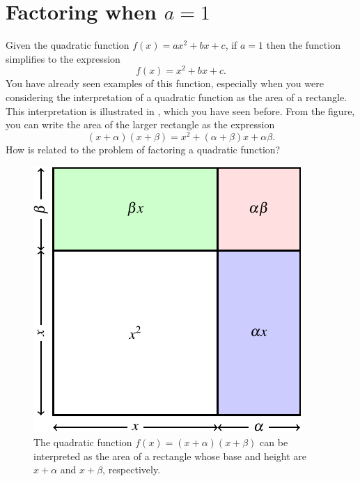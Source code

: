 \documentclass[a4paper,oneside,12pt]{article}
\begin{document}
\section{Factoring when $a = 1$}
\label{sec:factor_quadratic_a_1}

Given the quadratic function $f(x) = ax^2 + bx + c$, if $a = 1$ then
the function simplifies to the expression
\begin{equation}
\label{eqn:monic_quadratic_function}
f(x)
=
x^2 + bx + c.
\end{equation}
You have already seen examples of this function, especially when you
were considering the interpretation of a quadratic function as the
area of a rectangle.  This interpretation is illustrated in
, which you have seen before.  From
the figure, you can write the area of the larger rectangle as the
expression
\begin{equation}
\label{eqn:monic_quadratic_function_factored}
(x + \alpha) (x + \beta)
=
x^2 + (\alpha + \beta)x + \alpha\beta.
\end{equation}
How is  related to
the problem of factoring a quadratic function?

\begin{figure}[!htbp]
\centering
\includegraphics[scale=1.1]{image/08/quadratic-as-square.pdf}
\caption{%
  The quadratic function $f(x) = (x + \alpha)(x + \beta)$ can be
  interpreted as the area of a rectangle whose base and height are
  $x + \alpha$ and $x + \beta$, respectively.
}
\label{fig:quadratic_as_rectangle}
\end{figure}
\end{document}
